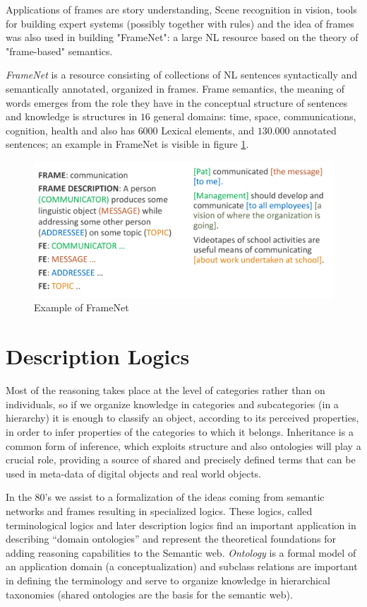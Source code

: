 Applications of frames are story understanding, Scene recognition in vision, tools
for building expert systems (possibly together with rules) and the idea of frames
was also used in building "FrameNet": a large NL resource based on the theory
of "frame-based" semantics.

\emph{FrameNet} is a resource consisting of collections of NL sentences syntactically and
semantically annotated, organized in frames.\newline
Frame semantics, the meaning of words emerges from the role they have in the 
conceptual structure of sentences and knowledge is structures in $16$ general domains:
time, space, communications, cognition, health and also has $6000$ Lexical elements,
and $130.000$ annotated sentences; 
an example in FrameNet is visible in figure \ref{img:framenet}.

\begin{figure}
	\includegraphics[width=\textwidth]{Images/framenet}
	\caption{Example of FrameNet}
	\label{img:framenet}
\end{figure}

\section{Description Logics}
Most of the reasoning takes place at the level of categories rather than on individuals,
so if we organize knowledge in categories and subcategories (in a hierarchy) it is enough
to classify an object, according to its perceived properties, in order to infer 
properties of the categories to which it belongs.\newline
Inheritance is a common form of inference, which exploits structure and also 
ontologies will play a crucial role, providing a source of shared and precisely defined
terms that can be used in meta-data of digital objects and real world objects.

In the $80$'s we assist to a formalization of the ideas coming from semantic
networks and frames resulting in specialized logics.\newline
These logics, called terminological logics and later description logics find an
important application in describing “domain ontologies” and represent the
theoretical foundations for adding reasoning capabilities to the Semantic web.\newline
\emph{Ontology} is a formal model of an application domain (a conceptualization) and
subclass relations are important in defining the terminology and serve to
organize knowledge in hierarchical taxonomies (shared ontologies are the basis
for the semantic web).

